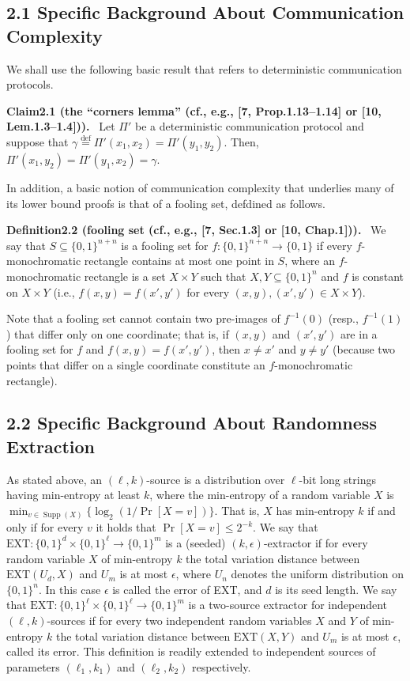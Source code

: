 \documentclass[10pt,a4paper]{article}
\newenvironment{authorclaim}[1]{\par\medskip\noindent\textbf{#1.}\ }{\par\medskip}
\begin{document}
\subsection*{2.1 Specific Background About Communication Complexity}
We shall use the following basic result that refers to deterministic communication protocols.
\begin{authorclaim}{Claim2.1 (the ``corners lemma'' (cf., e.g., [7, Prop.1.13--1.14] or [10, Lem.1.3--1.4]))}
Let $\Pi'$ be a deterministic communication protocol and suppose that $\gamma\stackrel{\mathrm{def}}=\Pi'(x_1,x_2)=\Pi'(y_1,y_2)$. Then, $\Pi'(x_1,y_2)=\Pi'(y_1,x_2)=\gamma$.
\end{authorclaim}
In addition, a basic notion of communication complexity that underlies many of its lower bound proofs is that of a fooling set, defdined as follows.
\begin{authorclaim}{Definition2.2 (fooling set (cf., e.g., [7, Sec.1.3] or [10, Chap.1]))}
We say that $S\subseteq\{0,1\}^{n+n}$ is a fooling set for $f:\{0,1\}^{n+n}\to\{0,1\}$ if every $f$-monochromatic rectangle contains at most one point in $S$, where an $f$-monochromatic rectangle is a set $X\times Y$ such that $X,Y\subseteq\{0,1\}^n$ and $f$ is constant on $X\times Y$ (i.e., $f(x,y)=f(x',y')$ for every $(x,y),(x',y')\in X\times Y$).
\end{authorclaim}
Note that a fooling set cannot contain two pre-images of $f^{-1}(0)$ (resp., $f^{-1}(1)$) that differ only on one coordinate; that is, if $(x,y)$ and $(x',y')$ are in a fooling set for $f$ and $f(x,y)=f(x',y')$, then $x\ne x'$ and $y\ne y'$ (because two points that differ on a single coordinate constitute an $f$-monochromatic rectangle).
\subsection*{2.2 Specific Background About Randomness Extraction}
As stated above, an $(\ell,k)$-source is a distribution over $\ell$-bit long strings having min-entropy at least $k$, where the min-entropy of a random variable $X$ is $\min_{v\in\operatorname{Supp}(X)}\{\log_2(1/\Pr[X=v])\}$. That is, $X$ has min-entropy $k$ if and only if for every $v$ it holds that $\Pr[X=v]\le2^{-k}$.
We say that $\mathrm{EXT}:\{0,1\}^d\times\{0,1\}^\ell\to\{0,1\}^m$ is a (seeded) $(k,\epsilon)$-extractor if for every random variable $X$ of min-entropy $k$ the total variation distance between $\mathrm{EXT}(U_d,X)$ and $U_m$ is at most $\epsilon$, where $U_n$ denotes the uniform distribution on $\{0,1\}^n$. In this case $\epsilon$ is called the error of EXT, and $d$ is its seed length.
We say that $\mathrm{EXT}:\{0,1\}^\ell\times\{0,1\}^\ell\to\{0,1\}^m$ is a two-source extractor for independent $(\ell,k)$-sources if for every two independent random variables $X$ and $Y$ of min-entropy $k$ the total variation distance between $\mathrm{EXT}(X,Y)$ and $U_m$ is at most $\epsilon$, called its error. This definition is readily extended to independent sources of parameters $(\ell_1,k_1)$ and $(\ell_2,k_2)$ respectively.
\end{document}
